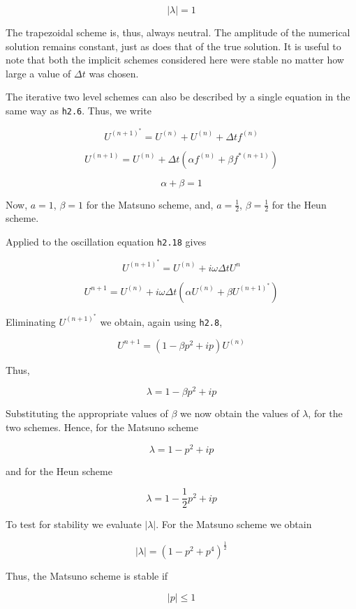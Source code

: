 \[| \lambda | = 1\]

The trapezoidal scheme is, thus, always neutral. The amplitude of the
numerical solution remains constant, just as does that of the true
solution. It is useful to note that both the implicit schemes considered
here were stable no matter how large a value of \(\Delta t\) was chosen.

The iterative two level schemes can also be described by a single
equation in the same way as \texttt{h2.6}. Thus, we write

\[U^{\left( n + 1 \right)^{*}} = U^{\left( n \right)} + U^{\left( n \right)} + \Delta t{ f}^{\left( n \right)}\]

\[U^{\left( n + 1 \right)} = U^{\left( n \right)} + \Delta t\left( \alpha f^{\left( n \right)} + \beta f^{*\left( n + 1 \right)} \right)\]

\[\alpha + \beta = 1\]

Now, \(a = 1\), \(\beta = 1\) for the Matsuno scheme, and,
\(a = \frac{1}{2}\), \(\beta = \frac{1}{2}\) for the Heun scheme.

Applied to the oscillation equation \texttt{h2.18} gives

\[U^{\left( n + 1 \right)^{*}} = U^{\left( n \right)} + i\omega \Delta t U^n\]

\[U^{n + 1} = U^{\left( n \right)} + i\omega\Delta t\left( \alpha U^{\left( n \right)} + \beta U^{\left( n + 1 \right)^{*}} \right)\]

Eliminating \(U^{\left( n + 1 \right)^{*}}\) we obtain, again using
\texttt{h2.8},

\[U^{n + 1} = \left( 1 - \beta p^{2} + ip \right)U^{\left( n \right)}\]

Thus,

\[\lambda = 1 - \beta p^{2} + ip\]

Substituting the appropriate values of \(\beta\) we now obtain the
values of \(\lambda\), for the two schemes. Hence, for the Matsuno
scheme

\[\lambda = 1 - p^{2} + ip\]

and for the Heun scheme

\[\lambda = 1 - \frac{1}{2}p^{2} + i p\]

To test for stability we evaluate \(| \lambda |\). For the Matsuno
scheme we obtain

\[| \lambda | = \left( 1 - p^{2} + p^{4} \right)^{\frac{1}{2}}\]

Thus, the Matsuno scheme is stable if

\[| p | \leq 1\]


